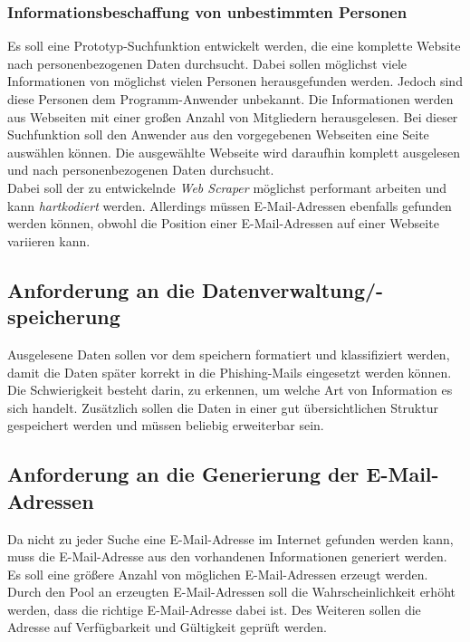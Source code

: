 		\subsubsection{Informationsbeschaffung von unbestimmten Personen}
		Es soll eine Prototyp-Suchfunktion entwickelt werden, die eine komplette Website nach personenbezogenen Daten durchsucht. Dabei sollen möglichst viele Informationen von möglichst vielen Personen herausgefunden werden. Jedoch sind diese Personen dem Programm-Anwender unbekannt. Die Informationen werden aus Webseiten mit einer großen Anzahl von Mitgliedern herausgelesen. Bei dieser Suchfunktion soll den Anwender aus den vorgegebenen Webseiten eine Seite auswählen können. Die ausgewählte Webseite wird daraufhin komplett ausgelesen und nach personenbezogenen Daten durchsucht.\\
		Dabei soll der zu entwickelnde \textit{Web Scraper} möglichst performant arbeiten und kann \textit{hartkodiert} werden. Allerdings müssen E-Mail-Adressen ebenfalls gefunden werden können, obwohl die Position einer E-Mail-Adressen auf einer Webseite variieren kann.
		
	\subsection{Anforderung an die Datenverwaltung/-speicherung}
	Ausgelesene Daten sollen vor dem speichern formatiert und klassifiziert werden, damit die Daten später korrekt in die Phishing-Mails eingesetzt werden können. Die Schwierigkeit besteht darin, zu erkennen, um welche Art von Information es sich handelt. Zusätzlich sollen die Daten in einer gut übersichtlichen Struktur gespeichert werden und müssen beliebig erweiterbar sein.
	
	\subsection{Anforderung an die Generierung der E-Mail-Adressen}
	Da nicht zu jeder Suche eine E-Mail-Adresse im Internet gefunden werden kann, muss die E-Mail-Adresse aus den vorhandenen Informationen generiert werden. Es soll eine größere Anzahl von möglichen E-Mail-Adressen erzeugt werden. Durch den Pool an erzeugten E-Mail-Adressen soll die Wahrscheinlichkeit erhöht werden, dass die richtige E-Mail-Adresse dabei ist. Des Weiteren sollen die Adresse auf Verfügbarkeit und Gültigkeit geprüft werden.
	
